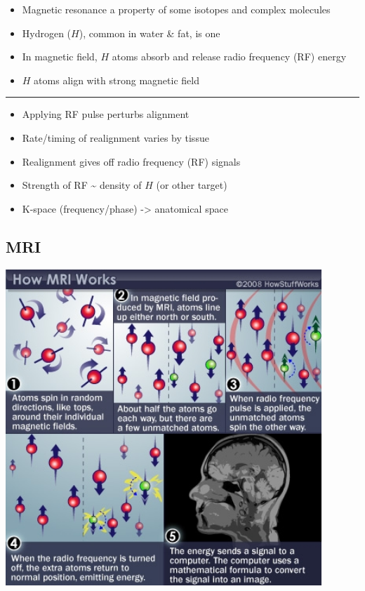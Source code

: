 \documentclass[]{article}
\providecommand{\tightlist}{%
  \setlength{\itemsep}{0pt}\setlength{\parskip}{0pt}}
\begin{document}
\begin{itemize}
\tightlist
\item
  Magnetic resonance a property of some isotopes and complex molecules
\item
  Hydrogen (\(H\)), common in water \& fat, is one
\item
  In magnetic field, \(H\) atoms absorb and release radio frequency (RF)
  energy
\item
  \(H\) atoms align with strong magnetic field
\end{itemize}

\begin{center}\rule{0.5\linewidth}{\linethickness}\end{center}

\begin{itemize}
\tightlist
\item
  Applying RF pulse perturbs alignment
\item
  Rate/timing of realignment varies by tissue
\item
  Realignment gives off radio frequency (RF) signals
\item
  Strength of RF \textasciitilde{} density of \(H\) (or other target)
\item
  K-space (frequency/phase) -\textgreater{} anatomical space
\end{itemize}

\hypertarget{mri}{%
\subsection{MRI}\label{mri}}

\begin{center}\includegraphics[width=450px]{img/mri-steps} \end{center}
\end{document}
